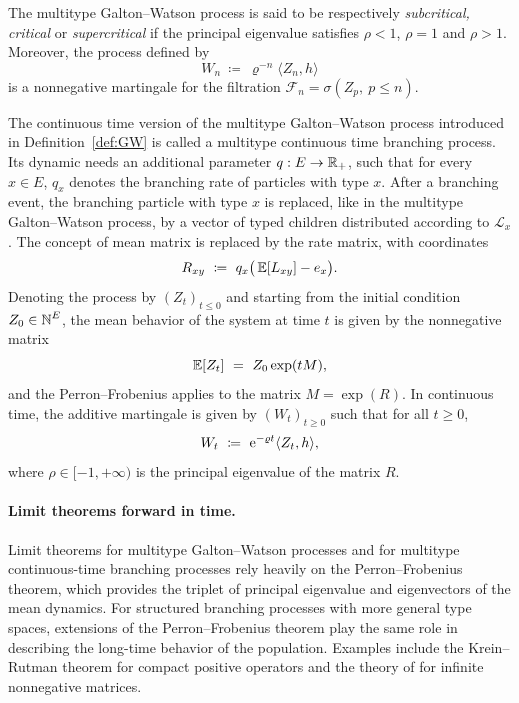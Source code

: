 The multitype Galton--Watson process is said to be respectively \emph{subcritical, critical} or \emph{supercritical} if the principal eigenvalue satisfies $\rho < 1$, $\rho=1$ and $\rho>1$.
Moreover, the process defined by
\begin{equation}\label{eq:additive_mart}
W_n\ \coloneqq\ \varrho^{-n} \langle Z_n, h\rangle
\end{equation}
is a nonnegative martingale for the filtration $\mathcal{F}_n=\sigma(Z_p,\ p\leq n)$.

\medskip

The continuous time version of the multitype Galton--Watson process introduced in Definition~\ref{def:GW} is called a multitype continuous time branching process. Its dynamic needs an additional parameter $q:E\to \operatorname{\mathbb{R}}_+$, such that for every $x\in E$, $q_x$ denotes the branching rate of particles with type $x$. After a branching event, the branching particle with type $x$ is replaced, like in the multitype Galton--Watson process, by a vector of typed children distributed according to $\mathcal{L}_x$. The concept of mean matrix is replaced by the rate matrix, with coordinates
\[
R_{xy}\ \coloneqq\ q_x\big(\E[L_{xy}]- e_x\big).
\]
Denoting the process by $(Z_t)_{t\leq 0}$ and starting from the initial condition $Z_0\in\operatorname{\mathbb{N}}^E$,  the mean behavior of the system at time $t$ is given by the nonnegative matrix
\[
\E[Z_t]\ =\ Z_0\exp(t M),
\]
and the Perron--Frobenius applies to the matrix $M=\exp(R)$. In continuous time, the additive martingale is given by $(W_t)_{t \geq 0}$ such that for all $t\geq 0$,
\[
W_t\ \coloneqq\ \operatorname{e}^{-\varrho t} \langle Z_t, h\rangle,
\]
where $\rho \in [-1, +\infty )$ is the principal eigenvalue of the matrix $R$.

\paragraph{Limit theorems forward in time.}
Limit theorems for multitype Galton--Watson processes and for multitype continuous-time branching processes rely heavily on the Perron--Frobenius theorem, which provides the triplet of principal eigenvalue and eigenvectors of the mean dynamics. For structured branching processes with more general type spaces, extensions of the Perron--Frobenius theorem play the same role in describing the long-time behavior of the population. Examples include the Krein--Rutman theorem for compact positive
operators and the theory of \citet{vere-jones_ergodic_1967} for infinite nonnegative matrices.


